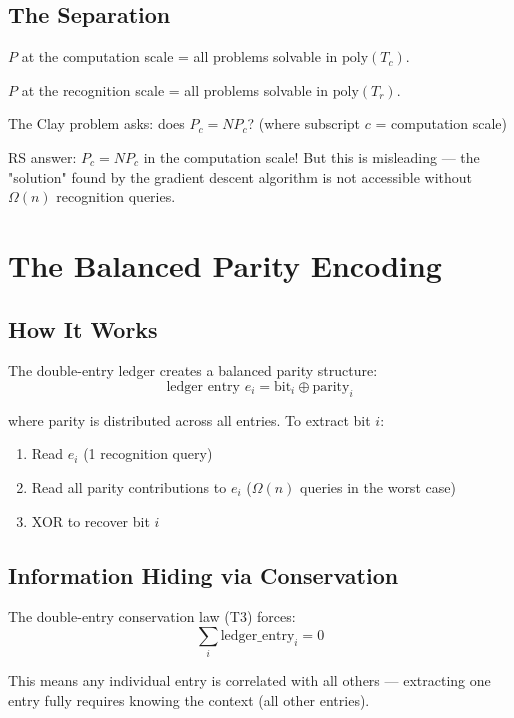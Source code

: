 \documentclass[12pt,a4paper]{article}
\theoremstyle{definition}
\theoremstyle{remark}
\begin{document}
\subsection{The Separation}

$P$ at the computation scale = all problems solvable in $\mathrm{poly}(T_c)$.

$P$ at the recognition scale = all problems solvable in $\mathrm{poly}(T_r)$.

The Clay problem asks: does $P_c = NP_c$? (where subscript $c$ = computation scale)

RS answer: $P_c = NP_c$ in the computation scale! But this is misleading — 
the "solution" found by the gradient descent algorithm is not accessible without 
$\Omega(n)$ recognition queries.

\section{The Balanced Parity Encoding}

\subsection{How It Works}

The double-entry ledger creates a balanced parity structure:
\begin{equation}
\text{ledger entry } e_i = \text{bit}_i \oplus \text{parity}_i
\end{equation}

where parity is distributed across all entries. To extract bit $i$:
\begin{enumerate}
\item Read $e_i$ (1 recognition query)
\item Read all parity contributions to $e_i$ ($\Omega(n)$ queries in the worst case)
\item XOR to recover bit $i$
\end{enumerate}

\subsection{Information Hiding via Conservation}

The double-entry conservation law (T3) forces:
\begin{equation}
\sum_i \text{ledger\_entry}_i = 0
\end{equation}

This means any individual entry is correlated with all others — extracting 
one entry fully requires knowing the context (all other entries).
\end{document}
